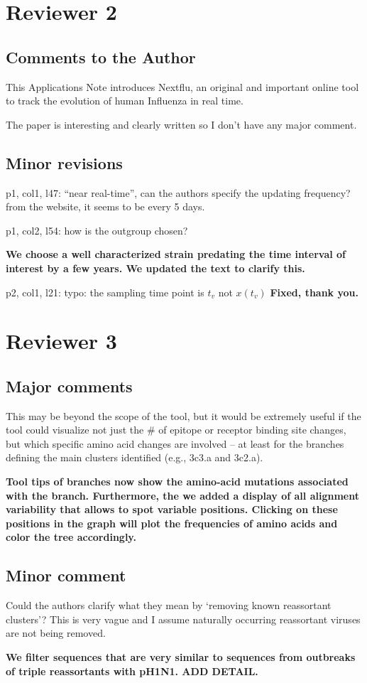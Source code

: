 \documentclass[11pt,oneside,letterpaper]{article}
\begin{document}
\section*{Reviewer 2}

\subsection*{Comments to the Author}

This Applications Note introduces Nextflu, an original and important online tool to track the evolution of human Influenza in real time.

The paper is interesting and clearly written so I don't have any major comment.

\subsection*{Minor revisions}

p1, col1, l47: ``near real-time'', can the authors specify the updating frequency? from the website, it seems to be every 5 days.

p1, col2, l54: how is the outgroup chosen?

{\bf We choose a well characterized strain predating the time interval of interest by a few years. We updated the text to clarify this.}

p2, col1, l21: typo: the sampling time point is $t_v$ not $x(t_v)$
{\bf Fixed, thank you.}

\section*{Reviewer 3}

\subsection*{Major comments}

This may be beyond the scope of the tool, but it would be extremely useful if the tool could visualize not just the \# of epitope or receptor binding site changes, but which specific amino acid changes are involved -- at least for the branches defining the main clusters identified (e.g., 3c3.a and 3c2.a).

{\bf Tool tips of branches now show the amino-acid mutations associated with the branch. Furthermore, the we added a display of all alignment variability that allows to spot variable positions. Clicking on these positions in the graph will plot the frequencies of amino acids and color the tree accordingly. }

\subsection*{Minor comment}

Could the authors clarify what they mean by `removing known reassortant clusters'?  This is very vague and I assume naturally occurring reassortant viruses are not being removed.

{\bf We filter sequences that are very similar to sequences from outbreaks of triple reassortants with pH1N1. ADD DETAIL.}
\end{document}
